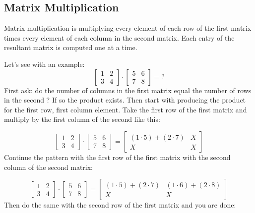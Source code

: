 \subsection{Matrix Multiplication}\label{matrix-multiplication}

Matrix multiplication is multiplying every element of each row of the first matrix times every element of each column in the second matrix. Each entry of the resultant matrix is computed one at a time.

Let's see with an example: 
\begin{equation*} 
\begin{bmatrix}
1 & 2 \\
3 & 4
\end{bmatrix}
\cdot
\begin{bmatrix}
5 & 6 \\
7 & 8
\end{bmatrix}
= ?
\end{equation*}
First ask: do the number of columns in the first matrix equal the number of rows in the second ? If so the product exists. Then start with producing the product for the first row, first column element. Take the first row of the first matrix and multiply by the first column of the second like this:

\begin{equation*} 
\begin{bmatrix}
1 & 2 \\
3 & 4
\end{bmatrix}
\cdot
\begin{bmatrix}
5 & 6 \\
7 & 8
\end{bmatrix}
=
\begin{bmatrix}
(1\cdot 5) + (2\cdot 7) & X \\
X & X
\end{bmatrix}
\end{equation*}
Continue the pattern with the first row of the first matrix with the second column of the second matrix:

\begin{equation*} 
\begin{bmatrix}
1 & 2 \\
3 & 4
\end{bmatrix}
\cdot
\begin{bmatrix}
5 & 6 \\
7 & 8
\end{bmatrix}
=
\begin{bmatrix}
(1\cdot 5) + (2\cdot 7) & (1\cdot 6) + (2\cdot 8)  \\
X & X
\end{bmatrix}
\end{equation*}
Then do the same with the second row of the first matrix and you are done:

